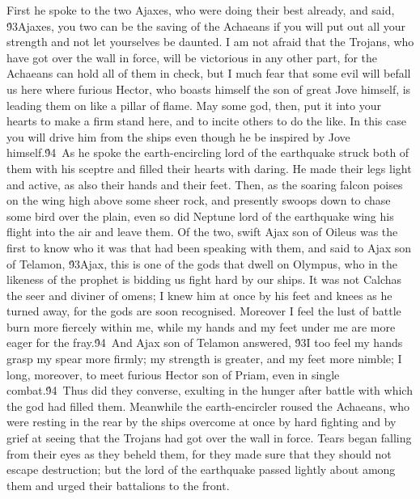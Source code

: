 {First he spoke to the two Ajaxes, who were doing their best already, and said, \'93Ajaxes, you two can be the saving of the Achaeans if you will put out all your strength and not let yourselves be daunted. I am not afraid that the Trojans, who have got over the wall in force, will be victorious in any other part, for the Achaeans can hold all of them in check, but I much fear that some evil will befall us here where furious Hector, who boasts himself the son of great Jove himself, is leading them on like a pillar of flame. May some god, then, put it into your hearts to make a firm stand here, and to incite others to do the like. In this case you will drive him from the ships even though he be inspired by Jove himself.\'94\
As he spoke the earth-encircling lord of the earthquake struck both of them with his sceptre and filled their hearts with daring. He made their legs light and active, as also their hands and their feet. Then, as the soaring falcon poises on the wing high above some sheer rock, and presently swoops down to chase some bird over the plain, even so did Neptune lord of the earthquake wing his flight into the air and leave them. Of the two, swift Ajax son of Oileus was the first to know who it was that had been speaking with them, and said to Ajax son of Telamon, \'93Ajax, this is one of the gods that dwell on Olympus, who in the likeness of the prophet is bidding us fight hard by our ships. It was not Calchas the seer and diviner of omens; I knew him at once by his feet and knees as he turned away, for the gods are soon recognised. Moreover I feel the lust of battle burn more fiercely within me, while my hands and my feet under me are more eager for the fray.\'94\
And Ajax son of Telamon answered, \'93I too feel my hands grasp my spear more firmly; my strength is greater, and my feet more nimble; I long, moreover, to meet furious Hector son of Priam, even in single combat.\'94\
Thus did they converse, exulting in the hunger after battle with which the god had filled them. Meanwhile the earth-encircler roused the Achaeans, who were resting in the rear by the ships overcome at once by hard fighting and by grief at seeing that the Trojans had got over the wall in force. Tears began falling from their eyes as they beheld them, for they made sure that they should not escape destruction; but the lord of the earthquake passed lightly about among them and urged their battalions to the front.\
}
